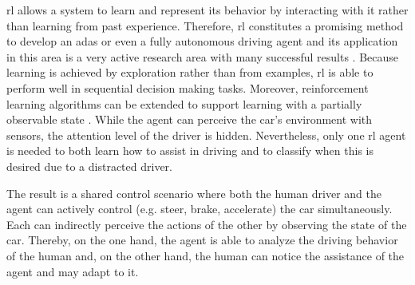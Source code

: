 


\Gls{rl} allows a system to learn and represent its behavior by interacting with it rather than learning from past experience. Therefore, \gls{rl} constitutes a promising method to develop an \gls{adas} or even a fully autonomous driving agent and its application in this area is a very active research area with many successful results \parencite{rl_driving_survey}. Because learning is achieved by exploration rather than from examples, \gls{rl} is able to perform well in sequential decision making tasks. Moreover, reinforcement learning algorithms can be extended to support learning with a partially observable state \parencite[p.~466]{RL_introductio}. While the agent can perceive the car's environment with sensors, the attention level of the driver is hidden. Nevertheless, only one \gls{rl} agent is needed to both learn how to assist in driving and to classify when this is desired due to a distracted driver.

The result is a shared control scenario where both the human driver and the agent can actively control (e.g. steer, brake, accelerate) the car simultaneously. Each can indirectly perceive the actions of the other by observing the state of the car. Thereby, on the one hand, the agent is able to analyze the driving behavior of the human and, on the other hand, the human can notice the assistance of the agent and may adapt to it. 







